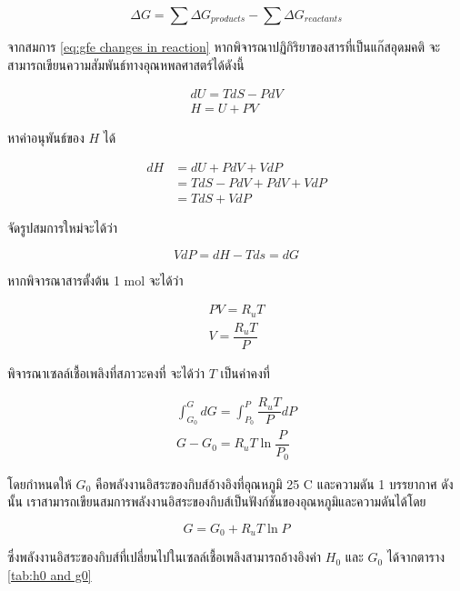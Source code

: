 \documentclass[11pt]{article}
\begin{document}
\begin{equation}
  \label{eq:gfe changes in reaction}
  \Delta G = \sum \Delta G_{products} - \sum \Delta G_{reactants}
\end{equation}

จากสมการ \ref{eq:gfe changes in reaction} หากพิจารณาปฏิกิริยาของสารที่เป็นแก๊สอุดมคติ จะสามารถเขียนความสัมพันธ์ทางอุณหพลศาสตร์ได้ดังนี้

\begin{gather}
  dU = TdS - PdV \\
  H = U + PV
\end{gather}

หาค่าอนุพันธ์ของ \(H\) ได้

\begin{align}
  dH &= dU + PdV + VdP \nonumber \\
     &= TdS - PdV + PdV + VdP \nonumber \\
     &= TdS + VdP
\end{align}

จัดรูปสมการใหม่จะได้ว่า

\begin{equation}
  VdP = dH - Tds = dG
\end{equation} 

หากพิจารณาสารตั้งต้น 1 mol จะได้ว่า

\begin{gather*}
  \label{eq:ideal gas equation}
  PV = R_u T \\
  V = \dfrac{R_u T}{P}
\end{gather*}

พิจารณาเซลล์เชื้อเพลิงที่สภาวะคงที่ จะได้ว่า \(T\) เป็นค่าคงที่

\begin{gather}
  \label{eq:gfe integral equation}
  \int_{G_0}^G dG = \int_{P_0}^P \dfrac{R_uT}{P}dP \\
  G - G_0 = R_u T \ln \dfrac{P}{P_0}
\end{gather}

โดยกำหนดให้ \(G_0\) คือพลังงานอิสระของกิบส์อ้างอิงที่อุณหภูมิ 25 C และความดัน 1 บรรยากาศ ดังนั้น เราสามารถเขียนสมการพลังงานอิสระของกิบส์เป็นฟังก์ชันของอุณหภูมิและความดันได้โดย

\begin{equation}
  \label{eq:gfe ideal gas}
  G = G_0 + R_u T \ln P
\end{equation}

ซึ่งพลังงานอิสระของกิบส์ที่เปลี่ยนไปในเซลล์เชื้อเพลิงสามารถอ้างอิงค่า \(H_0\) และ \(G_0\) ได้จากตาราง \ref{tab:h0 and g0} 
\end{document}
